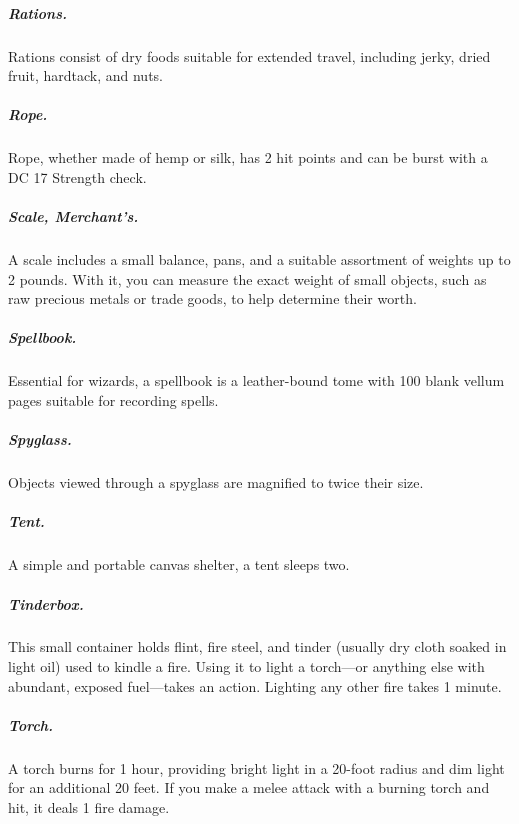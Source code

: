 \subparagraph*{Rations.} Rations consist of dry foods suitable for extended travel, including jerky, dried fruit, hardtack, and nuts.

\subparagraph*{Rope.} Rope, whether made of hemp or silk, has 2 hit points and can be burst with a DC 17 Strength check.

\subparagraph*{Scale, Merchant's.} A scale includes a small balance, pans, and a suitable assortment of weights up to 2 pounds. With it, you can measure the exact weight of small objects, such as raw precious metals or trade goods, to help determine their worth.

\subparagraph*{Spellbook.} Essential for wizards, a spellbook is a leather-bound tome with 100 blank vellum pages suitable for recording spells.

\subparagraph*{Spyglass.} Objects viewed through a spyglass are magnified to twice their size.

\subparagraph*{Tent.} A simple and portable canvas shelter, a tent sleeps two.

\subparagraph*{Tinderbox.} This small container holds flint, fire steel, and tinder (usually dry cloth soaked in light oil) used to kindle a fire. Using it to light a torch—or anything else with abundant, exposed fuel—takes an action. Lighting any other fire takes 1 minute.

\subparagraph*{Torch.} A torch burns for 1 hour, providing bright light in a 20-foot radius and dim light for an additional 20 feet. If you make a melee attack with a burning torch and hit, it deals 1 fire damage.


